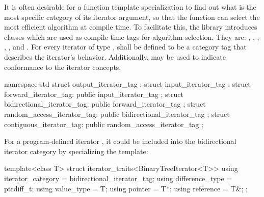 \pnum
{}%
%
%
%
%
%
It is often desirable for a
function template specialization
to find out what is the most specific category of its iterator
argument, so that the function can select the most efficient algorithm at compile time.
To facilitate this, the
library introduces
classes which are used as compile time tags for algorithm selection.
They are:
,
,
,
,
,
and
.
For every iterator of type
,
shall be defined to be a category tag that describes the
iterator's behavior.
Additionally,
may be used to indicate conformance to
the iterator concepts.

\begin{codeblock}
namespace std {
  struct output_iterator_tag { };
  struct input_iterator_tag { };
  struct forward_iterator_tag: public input_iterator_tag { };
  struct bidirectional_iterator_tag: public forward_iterator_tag { };
  struct random_access_iterator_tag: public bidirectional_iterator_tag { };
  struct contiguous_iterator_tag: public random_access_iterator_tag { };
}
\end{codeblock}

\pnum
\begin{example}
For a program-defined iterator
,
it could be included
into the bidirectional iterator category by specializing the
template:

\begin{codeblock}
template<class T> struct iterator_traits<BinaryTreeIterator<T>> {
  using iterator_category = bidirectional_iterator_tag;
  using difference_type   = ptrdiff_t;
  using value_type        = T;
  using pointer           = T*;
  using reference         = T&;
};
\end{codeblock}
\end{example}

